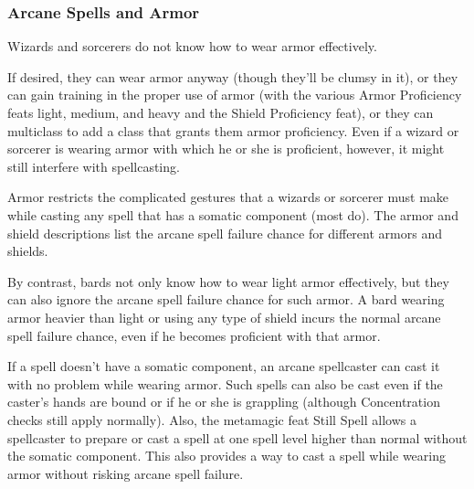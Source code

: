 \subsubsection{Arcane Spells and Armor}

\smallskip Wizards and sorcerers do not know how to wear armor effectively.

\smallskip If desired, they can wear armor anyway (though they'll be clumsy in it), or they can gain training in the proper use of armor (with the various Armor Proficiency feats light, medium, and heavy and the Shield Proficiency feat), or they can multiclass to add a class that grants them armor proficiency. Even if a wizard or sorcerer is wearing armor with which he or she is proficient, however, it might still interfere with spellcasting.

\smallskip Armor restricts the complicated gestures that a wizards or sorcerer must make while casting any spell that has a somatic component (most do). The armor and shield descriptions list the arcane spell failure chance for different armors and shields.

\smallskip By contrast, bards not only know how to wear light armor effectively, but they can also ignore the arcane spell failure chance for such armor. A bard wearing armor heavier than light or using any type of shield incurs the normal arcane spell failure chance, even if he becomes proficient with that armor.

\smallskip If a spell doesn't have a somatic component, an arcane spellcaster can cast it with no problem while wearing armor. Such spells can also be cast even if the caster's hands are bound or if he or she is grappling (although Concentration checks still apply normally). Also, the metamagic feat Still Spell allows a spellcaster to prepare or cast a spell at one spell level higher than normal without the somatic component. This also provides a way to cast a spell while wearing armor without risking arcane spell failure. 